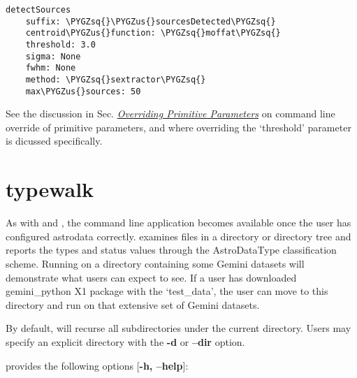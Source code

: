 \documentclass[letterpaper,10pt,english]{sphinxmanual}
\def\PYGZus{\char`\_}
\def\PYGZsq{\char`\'}
\begin{document}
\begin{Verbatim}[commandchars=\\\{\}]
detectSources
    suffix: \PYGZsq{}\PYGZus{}sourcesDetected\PYGZsq{}
    centroid\PYGZus{}function: \PYGZsq{}moffat\PYGZsq{}
    threshold: 3.0
    sigma: None
    fwhm: None
    method: \PYGZsq{}sextractor\PYGZsq{}
    max\PYGZus{}sources: 50
\end{Verbatim}

See the discussion in Sec. {\hyperref[interfaces:userpars]{\emph{Overriding Primitive Parameters}}} on command line override of
primitive parameters, and where overriding the `threshold' parameter is dicussed
specifically.


\section{typewalk}
\label{supptools:typewalk}\label{supptools:id1}
As with  and , the command line application 
becomes available once the user has configured astrodata correctly. 
examines files in a directory or directory tree and reports the types and status
values through the AstroDataType classification scheme. Running  on a
directory containing some Gemini datasets will demonstrate what users can expect
to see. If a user has downloaded gemini\_python X1 package with the `test\_data', the
user can move to this directory and run  on that extensive set of
Gemini datasets.

By default,  will recurse all subdirectories under the current
directory. Users may specify an explicit directory with the \textbf{-d} or
\textbf{--dir} option.

 provides the following options {[}\textbf{-h, --help}{]}:
\end{document}
